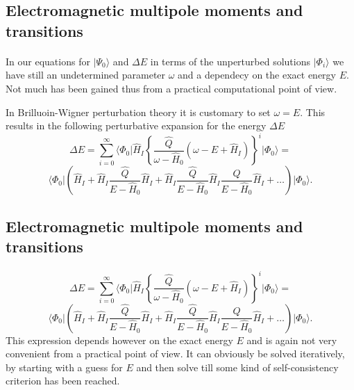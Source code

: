 \documentclass[%
oneside,                 %
final,                   %
10pt]{article}
\begin{document}
\subsection{Electromagnetic multipole moments and transitions}

\paragraph{}
In our equations for $\vert \Psi_0\rangle$ and $\Delta E$ in terms of the unperturbed
solutions $\vert \Phi_i\rangle$  we have still an undetermined parameter $\omega$
and a dependecy on the exact energy $E$. Not much has been gained thus from a practical computational point of view. 

In Brilluoin-Wigner perturbation theory it is customary to set $\omega=E$. This results in the following perturbative expansion for the energy $\Delta E$
\[
\Delta E=\sum_{i=0}^{\infty}\langle \Phi_0\vert \hat{H}_I\left\{\frac{\hat{Q}}{\omega-\hat{H}_0}\left(\omega-E+\hat{H}_I\right)\right\}^i\vert \Phi_0\rangle=
\]
\[
\langle \Phi_0\vert \left(\hat{H}_I+\hat{H}_I\frac{\hat{Q}}{E-\hat{H}_0}\hat{H}_I+
\hat{H}_I\frac{\hat{Q}}{E-\hat{H}_0}\hat{H}_I\frac{\hat{Q}}{E-\hat{H}_0}\hat{H}_I+\dots\right)\vert \Phi_0\rangle. 
\]



\subsection{Electromagnetic multipole moments and transitions}

\paragraph{}
\[
\Delta E=\sum_{i=0}^{\infty}\langle \Phi_0\vert \hat{H}_I\left\{\frac{\hat{Q}}{\omega-\hat{H}_0}\left(\omega-E+\hat{H}_I\right)\right\}^i\vert \Phi_0\rangle=\]
\[
\langle \Phi_0\vert \left(\hat{H}_I+\hat{H}_I\frac{\hat{Q}}{E-\hat{H}_0}\hat{H}_I+
\hat{H}_I\frac{\hat{Q}}{E-\hat{H}_0}\hat{H}_I\frac{\hat{Q}}{E-\hat{H}_0}\hat{H}_I+\dots\right)\vert \Phi_0\rangle. 
\]
This expression depends however on the exact energy $E$ and is again not very convenient from a practical point of view. It can obviously be solved iteratively, by starting with a guess for  $E$ and then solve till some kind of self-consistency criterion has been reached. 
\end{document}
